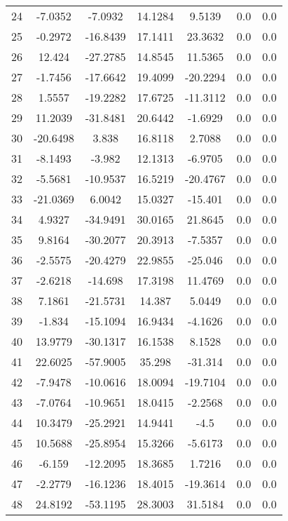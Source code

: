 \documentclass[journal=jacsat,manuscript=article]{achemso}
\begin{document}
\begin{table}
\begin{tabular}{ccccccc}
24 & -7.0352 & -7.0932 & 14.1284 & 9.5139 & 0.0 & 0.0 \\ 
25 & -0.2972 & -16.8439 & 17.1411 & 23.3632 & 0.0 & 0.0 \\ 
26 & 12.424 & -27.2785 & 14.8545 & 11.5365 & 0.0 & 0.0 \\ 
27 & -1.7456 & -17.6642 & 19.4099 & -20.2294 & 0.0 & 0.0 \\ 
28 & 1.5557 & -19.2282 & 17.6725 & -11.3112 & 0.0 & 0.0 \\ 
29 & 11.2039 & -31.8481 & 20.6442 & -1.6929 & 0.0 & 0.0 \\ 
30 & -20.6498 & 3.838 & 16.8118 & 2.7088 & 0.0 & 0.0 \\ 
31 & -8.1493 & -3.982 & 12.1313 & -6.9705 & 0.0 & 0.0 \\ 
32 & -5.5681 & -10.9537 & 16.5219 & -20.4767 & 0.0 & 0.0 \\ 
33 & -21.0369 & 6.0042 & 15.0327 & -15.401 & 0.0 & 0.0 \\ 
34 & 4.9327 & -34.9491 & 30.0165 & 21.8645 & 0.0 & 0.0 \\ 
35 & 9.8164 & -30.2077 & 20.3913 & -7.5357 & 0.0 & 0.0 \\ 
36 & -2.5575 & -20.4279 & 22.9855 & -25.046 & 0.0 & 0.0 \\ 
37 & -2.6218 & -14.698 & 17.3198 & 11.4769 & 0.0 & 0.0 \\ 
38 & 7.1861 & -21.5731 & 14.387 & 5.0449 & 0.0 & 0.0 \\ 
39 & -1.834 & -15.1094 & 16.9434 & -4.1626 & 0.0 & 0.0 \\ 
40 & 13.9779 & -30.1317 & 16.1538 & 8.1528 & 0.0 & 0.0 \\ 
41 & 22.6025 & -57.9005 & 35.298 & -31.314 & 0.0 & 0.0 \\ 
42 & -7.9478 & -10.0616 & 18.0094 & -19.7104 & 0.0 & 0.0 \\ 
43 & -7.0764 & -10.9651 & 18.0415 & -2.2568 & 0.0 & 0.0 \\ 
44 & 10.3479 & -25.2921 & 14.9441 & -4.5 & 0.0 & 0.0 \\ 
45 & 10.5688 & -25.8954 & 15.3266 & -5.6173 & 0.0 & 0.0 \\ 
46 & -6.159 & -12.2095 & 18.3685 & 1.7216 & 0.0 & 0.0 \\ 
47 & -2.2779 & -16.1236 & 18.4015 & -19.3614 & 0.0 & 0.0 \\ 
48 & 24.8192 & -53.1195 & 28.3003 & 31.5184 & 0.0 & 0.0 \\ 
\hline 

  \end{tabular}
\end{table}
\end{document}
